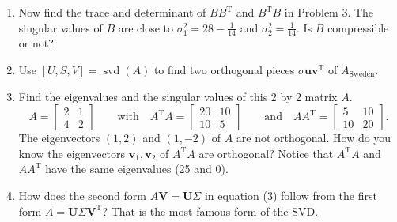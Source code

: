 \documentclass[14pt, a4paper]{article}
\begin{document}
\begin{enumerate}
    \item Now find the trace and determinant of $BB^{\mathrm{T}}$ and $B^{\mathrm{T}}B$ in Problem 3. The singular values of $B$ are close to $\sigma_1^2 = 28 - \frac{1}{14}$ and $\sigma_2^2 = \frac{1}{14}$. Is $B$ compressible or not?

    \item Use $[U, S, V] = \operatorname{svd}(A)$ to find two orthogonal pieces $\sigma \boldsymbol{u}\boldsymbol{v}^{\mathrm{T}}$ of $A_{\text{Sweden}}$.

    \item Find the eigenvalues and the singular values of this 2 by 2 matrix $A$.
          \[
              A = \begin{bmatrix} 2 & 1 \\ 4 & 2 \end{bmatrix} \qquad \text{with} \quad A^{\mathrm{T}}A = \begin{bmatrix} 20 & 10 \\ 10 & 5 \end{bmatrix} \qquad \text{and} \quad AA^{\mathrm{T}} = \begin{bmatrix} 5 & 10 \\ 10 & 20 \end{bmatrix}.
          \]
          The eigenvectors $(1, 2)$ and $(1, -2)$ of $A$ are not orthogonal. How do you know the eigenvectors $\boldsymbol{v}_1, \boldsymbol{v}_2$ of $A^{\mathrm{T}}A$ are orthogonal? Notice that $A^{\mathrm{T}}A$ and $AA^{\mathrm{T}}$ have the same eigenvalues (25 and 0).

    \item How does the second form $A\boldsymbol{V} = \boldsymbol{U}\Sigma$ in equation (3) follow from the first form $A = \boldsymbol{U}\Sigma\boldsymbol{V}^{\mathrm{T}}$? That is the most famous form of the SVD.


\end{enumerate}
\end{document}
